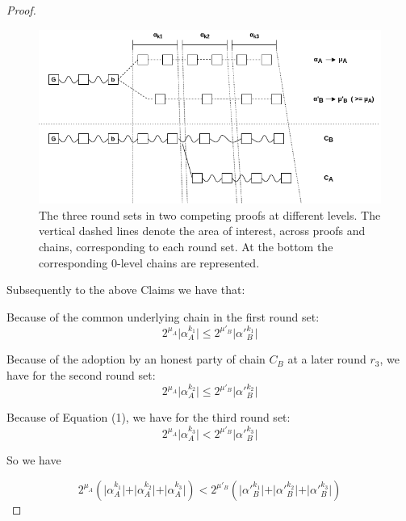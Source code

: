 \begin{proof}
	\begin{figure}[h]
		\begin{center}
			\includegraphics[width=0.9\columnwidth]{figures/claim3.png}
		\end{center}
		\caption{The three round sets in two competing proofs at different levels.
		The vertical dashed lines denote the area of interest, across proofs and chains,
		corresponding to each round set. At the bottom the corresponding 0-level chains
		are represented.}
		\label{fig:claim3}
	\end{figure}

	Subsequently to the above Claims we have that:

	Because of the common underlying chain in the first round set:
	\begin{equation} \label{eq_round_set_1}
	2^{\mu_A} \vert \alpha_A^{k_1} \vert \leq 2^{\mu'_B} \vert \alpha'{_B^{k_1}} \vert
	\end{equation}

	Because of the adoption by an honest party of chain $C_B$ at a later round $r_3$, 
	we have for the second round set:
	\begin{equation} \label{eq_round_set_2}
	2^{\mu_A} \vert \alpha_A^{k_2} \vert \leq 2^{\mu'_B} \vert \alpha'{_B^{k_2}} \vert
	\end{equation}

	Because of Equation (1), we have for the third round set:
	\begin{equation} \label{eq_round_set_3}
	2^{\mu_A} \vert \alpha_A^{k_3} \vert < 2^{\mu'_B} \vert \alpha'{_B^{k_3}} \vert
	\end{equation}

	So we have

	\begin{equation*}
	2^{\mu_A} ( \vert \alpha_A^{k_1} \vert + \vert \alpha_A^{k_2} \vert + \vert
	\alpha_A^{k_3} \vert ) < 2^{\mu'_B} ( \vert \alpha'{_B^{k_1}} \vert + \vert
	\alpha'{_B^{k_2}} \vert + \vert \alpha'{_B^{k_3}} \vert)
	\end{equation*}


\end{proof}
